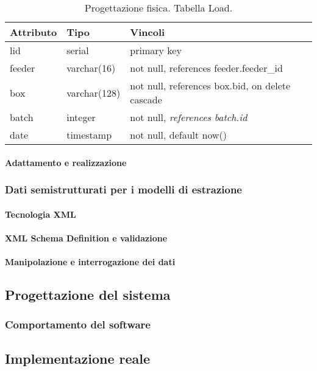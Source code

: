 \begin{table}
\begin{tabular}{| l | l | l |}
  \hline Attributo & Tipo & Vincoli\\
  \hline lid & serial & primary key \\
  \hline feeder & varchar(16) & not null, references feeder.feeder\_id\\
  \hline box & varchar(128) & not null, references box.bid, on delete cascade\\
  \hline batch & integer & not null, \textit{references batch.id}\\
  \hline date & timestamp & not null, default now()\\
  \hline
\end{tabular}
\label{tab:loadtable}
\caption[Documentazione ER: relazioni]{Progettazione fisica. Tabella Load.}
\end{table}
\paragraph{Adattamento e realizzazione}
\subsubsection{Dati semistrutturati per i modelli di estrazione}
\paragraph{Tecnologia XML}
\paragraph{XML Schema Definition e validazione}
\paragraph{Manipolazione e interrogazione dei dati}

\subsection{Progettazione del sistema}
\subsubsection{Comportamento del software}

\subsection{Implementazione reale}
